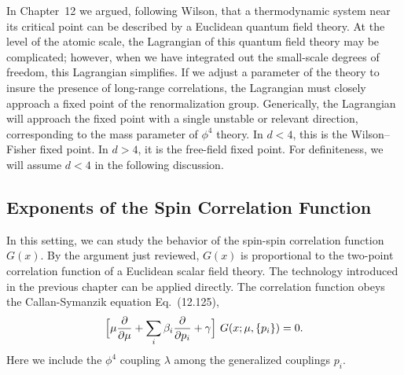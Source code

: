 In Chapter~12 we argued, following Wilson, that a thermodynamic system near
its critical point can be described by a Euclidean quantum field theory.  At
the level of the atomic scale, the Lagrangian of this quantum field theory may
be complicated; however, when we have integrated out the small-scale degrees
of freedom, this Lagrangian simplifies.  If we adjust a parameter of the
theory to insure the presence of long-range correlations, the Lagrangian must
closely approach a fixed point of the renormalization group.  Generically, the
Lagrangian will approach the fixed point with a single unstable or relevant
direction, corresponding to the mass parameter of $\phi^4$ theory.  In
$d < 4$, this is the Wilson--Fisher fixed point.  In $d > 4$, it is the
free-field fixed point.  For definiteness, we will assume $d < 4$ in the
following discussion.

\subsection{Exponents of the Spin Correlation Function}

In this setting, we can study the behavior of the spin-spin correlation
function $G(x)$.  By the argument just reviewed, $G(x)$ is proportional to
the two-point correlation function of a Euclidean scalar field theory.  The
technology introduced in the previous chapter can be applied directly.  The
correlation function obeys the Callan-Symanzik equation Eq.~(12.125),
\begin{equation}
  \Bigl[ \mu\frac{\partial}{\partial\mu} + \sum_i \beta_i\frac{\partial}
    {\partial p_i} + \gamma \Bigr]\ G(x; \mu, \{p_i\}) = 0 .
  \label{eq:13.10}
\end{equation}
Here we include the $\phi^4$ coupling $\lambda$ among the generalized
couplings $p_i$.

